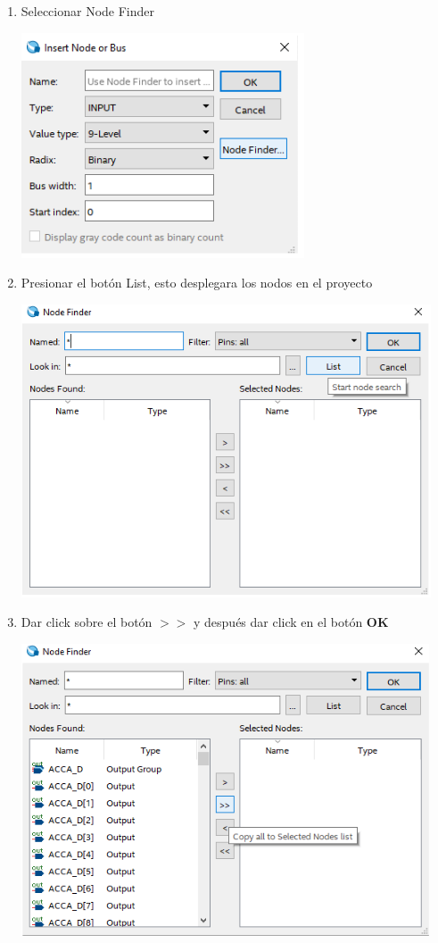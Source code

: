 \documentclass{IEEEtran}
\begin{document}
\begin{enumerate}
\begin{center}
\end{center}
\item Seleccionar Node Finder
\begin{center}
\includegraphics[width=0.6\linewidth]{./img/sim2.png}
\end{center}
\item Presionar el botón List, esto desplegara los nodos en el proyecto
\begin{center}
\includegraphics[width=0.6\linewidth]{./img/sim3.png}
\end{center}
\item Dar click sobre el botón \(>>\) y después dar click en el botón \textbf{OK}
\begin{center}
\includegraphics[width=0.6\linewidth]{./img/sim4.png}
\end{center}

\end{enumerate}
\end{document}
